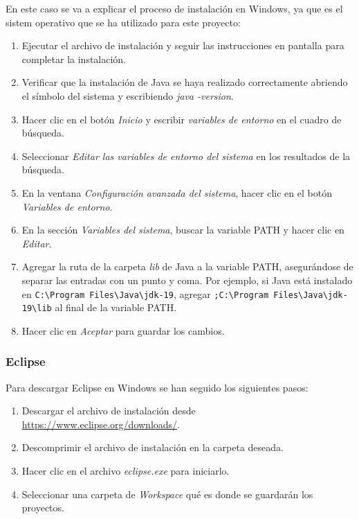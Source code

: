 En este caso se va a explicar el proceso de instalación en Windows, ya que es el sistem operativo que se ha utilizado para este proyecto:
\begin{enumerate}
    \item Ejecutar el archivo de instalación y seguir las instrucciones en pantalla para completar la instalación.
    \item Verificar que la instalación de Java se haya realizado correctamente abriendo el símbolo del sistema y escribiendo \textit{java -version}.
    \item Hacer clic en el botón \textit{Inicio} y escribir \textit{variables de entorno} en el cuadro de búsqueda.
    \item Seleccionar \textit{Editar las variables de entorno del sistema} en los resultados de la búsqueda.
    \item En la ventana \textit{Configuración avanzada del sistema}, hacer clic en el botón \textit{Variables de entorno}.
    \item En la sección \textit{Variables del sistema}, buscar la variable PATH y hacer clic en \textit{Editar}.
    \item Agregar la ruta de la carpeta \textit{lib} de Java a la variable PATH, asegurándose de separar las entradas con un punto y coma. Por ejemplo, si Java está instalado en \texttt{C:\textbackslash Program Files\textbackslash Java\textbackslash jdk-19}, agregar \texttt{;C:\textbackslash Program Files\textbackslash Java\textbackslash jdk-19\textbackslash lib} al final de la variable PATH.
    \item Hacer clic en \textit{Aceptar} para guardar los cambios.

\end{enumerate}

\subsubsection{Eclipse}
Para descargar Eclipse en Windows se han seguido los siguientes pasos:
\begin{enumerate}
    \item Descargar el archivo de instalación desde \url{https://www.eclipse.org/downloads/}.
    \item Descomprimir el archivo de instalación en la carpeta deseada.
    \item Hacer clic en el archivo \textit{eclipse.exe} para iniciarlo.
    \item Seleccionar una carpeta de \textit{Workspace} qué es donde se guardarán los proyectos.
\end{enumerate} 

